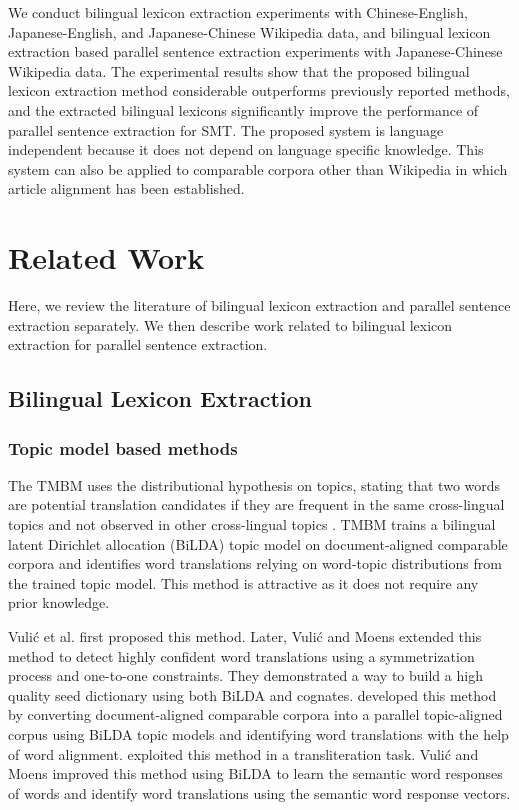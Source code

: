 \documentclass[english]{jnlp_1.4}
\begin{document}
We conduct bilingual lexicon extraction experiments with Chinese-English, Japanese-English, and 
Japanese-Chinese Wikipedia data, and bilingual lexicon extraction based parallel sentence 
extraction experiments with Japanese-Chinese Wikipedia data. The experimental 
results show that the proposed bilingual lexicon extraction method considerable outperforms 
previously reported methods, and the extracted bilingual lexicons significantly improve the performance of parallel 
sentence extraction for SMT. The proposed system is language independent 
because it does not depend on language specific knowledge.
This system can also be applied to comparable corpora other than Wikipedia
in which article alignment has been established.


\section{Related Work}

Here, we review the literature of bilingual lexicon extraction and parallel sentence extraction 
separately. We then describe work related to bilingual lexicon extraction for parallel sentence extraction.


\subsection{Bilingual Lexicon Extraction}

\subsubsection{Topic model based methods}

The TMBM uses the distributional hypothesis on topics, stating
that two words are potential translation candidates if they are frequent
in the same cross-lingual topics and not observed in other
cross-lingual topics \cite{vulic-desmet-moens:2011:ACL-HLT2011}.
TMBM trains a bilingual latent Dirichlet allocation (BiLDA) topic model on
document-aligned comparable corpora and identifies word translations
relying on word-topic distributions from the trained topic model. This
method is attractive as it does not require any prior knowledge.

Vuli\'{c} et al. \citeyear{vulic-desmet-moens:2011:ACL-HLT2011}
first proposed this method. Later, Vuli\'{c} and Moens
\citeyear{vulic-moens:2012:EACL2012} extended this method to detect
highly confident word translations using a symmetrization
process and one-to-one constraints. They demonstrated a
way to build a high quality seed dictionary using both BiLDA and
cognates. 
developed this method by converting document-aligned comparable corpora
into a parallel topic-aligned corpus using BiLDA topic models and 
identifying word translations with the help of word alignment.  exploited this method in a
transliteration task. Vuli\'{c} and Moens \citeyear{vulic-moens:2013:NAACL-HLT} 
improved this method using BiLDA to learn the semantic word responses of 
words and identify word translations using the semantic word response vectors.
\end{document}
